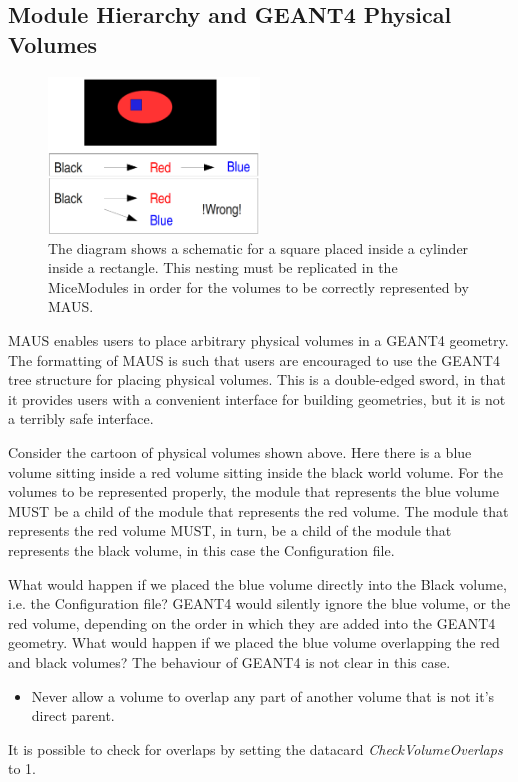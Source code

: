\subsection[Module Hierarchy and GEANT4 Physical Volumes]{Module Hierarchy and GEANT4 Physical Volumes}
\begin{figure}[!htb]
\begin{center}
\includegraphics[width=0.5\textwidth]{mice_modules/volume_hierarchy.png}
\caption{The diagram shows a schematic for a square placed inside a cylinder inside a rectangle. This nesting must be replicated
         in the MiceModules in order for the volumes to be correctly represented by MAUS.}
\end{center}
\end{figure}
MAUS enables users to place arbitrary physical volumes in a GEANT4 geometry. The
formatting of MAUS is such that users are encouraged to use the GEANT4 tree structure for placing physical volumes.
This is a double-edged sword, in that it provides users with a convenient interface for building geometries, but it is
not a terribly safe interface.

Consider the cartoon of physical volumes shown above. Here there is a blue volume sitting inside a red volume sitting
inside the black world volume. For the volumes to be represented properly, the module that represents the blue volume
MUST be a child of the module that represents the red volume. The module that represents the red volume MUST, in turn,
be a child of the module that represents the black volume, in this case the Configuration file.

What would happen if we placed the blue volume directly into the Black volume, i.e. the Configuration file? GEANT4 would
silently ignore the blue volume, or the red volume, depending on the order in which they are added into the GEANT4
geometry. What would happen if we placed the blue volume overlapping the red and black volumes? The behaviour of GEANT4
is not clear in this case.

\liststyleLiii
\begin{itemize}
\item Never allow a volume to overlap any part of another volume that is not it's direct parent.
\end{itemize}
It is possible to check for overlaps by setting the datacard \textit{CheckVolumeOverlaps} to 1.

